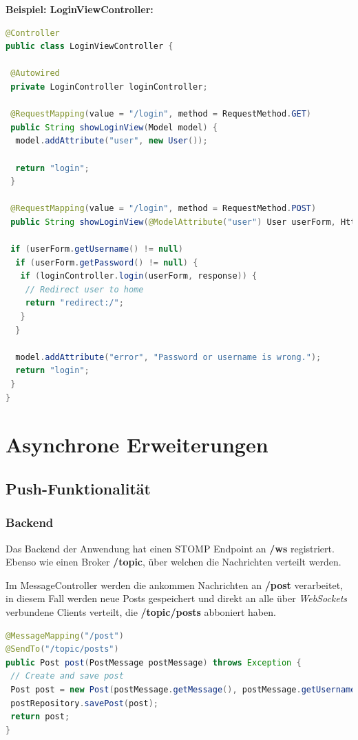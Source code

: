 \documentclass[
    a4paper
]{scrreprt}
\begin{document}
	\textbf{Beispiel: LoginViewController:}
	\begin{lstlisting}[language=java]
@Controller
public class LoginViewController {

 @Autowired
 private LoginController loginController;

 @RequestMapping(value = "/login", method = RequestMethod.GET)
 public String showLoginView(Model model) {
  model.addAttribute("user", new User());

  return "login";
 }

 @RequestMapping(value = "/login", method = RequestMethod.POST)
 public String showLoginView(@ModelAttribute("user") User userForm, HttpServletResponse response, Model model) {

 if (userForm.getUsername() != null)
  if (userForm.getPassword() != null) {
   if (loginController.login(userForm, response)) {
    // Redirect user to home
    return "redirect:/";
   }
  }

  model.addAttribute("error", "Password or username is wrong.");
  return "login";
 }
}
	\end{lstlisting}

    \chapter{Asynchrone Erweiterungen}
    \section{Push-Funktionalität}
    \subsection{Backend}
	Das Backend der Anwendung hat einen STOMP Endpoint an \textbf{/ws} registriert. Ebenso wie einen Broker \textbf{/topic}, über welchen die Nachrichten verteilt werden.
	
	Im MessageController werden die ankommen Nachrichten an \textbf{/post} verarbeitet, in diesem Fall werden neue Posts gespeichert und direkt an alle über \textit{WebSockets} verbundene Clients verteilt, die \textbf{/topic/posts} abboniert haben.
	
	\begin{lstlisting}[language=java]
@MessageMapping("/post")
@SendTo("/topic/posts")
public Post post(PostMessage postMessage) throws Exception {
 // Create and save post
 Post post = new Post(postMessage.getMessage(), postMessage.getUsername());
 postRepository.savePost(post);
 return post;
}
	\end{lstlisting}
	
\end{document}
